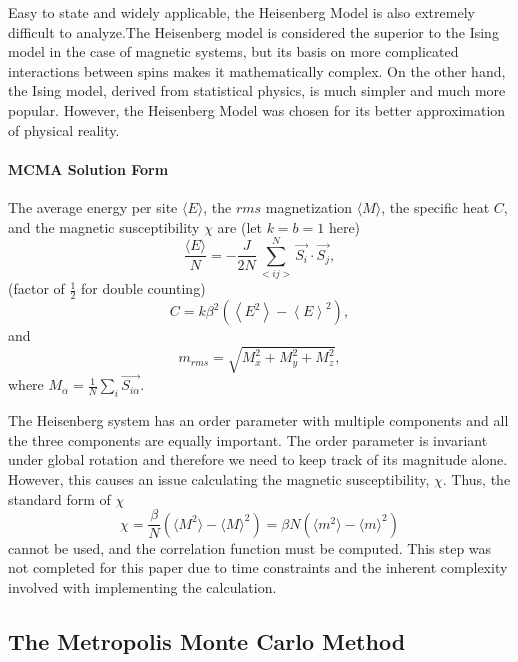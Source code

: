\documentclass[a4paper,12pt]{article}
\begin{document}
Easy to state and widely applicable, the Heisenberg Model is also extremely difficult to analyze.The Heisenberg model is considered the superior to the Ising model in the case of magnetic systems, but its basis on more complicated interactions between spins makes it mathematically complex. On the other hand, the Ising model, derived from statistical physics, is much simpler and much more popular. However, the Heisenberg Model was chosen for its better approximation of physical reality.
		\paragraph{MCMA Solution Form}
The average energy per site $\langle E \rangle$, the $rms$ magnetization  $\langle M \rangle$, the specific heat $C$, and the magnetic susceptibility $\chi$ are (let $k = b = 1$ here)
	\begin{equation}
		\frac{\langle E \rangle}{N} = -\frac{J}{2N}\sum_{<ij>}^{N}\vec{S_i}\cdot\vec{S_j},
	\end{equation}
	(factor of $\frac{1}{2}$ for double counting)
	\begin{equation}
		C = k\beta^2(\left< E^2 \right> - \left< E \right>^2),
	\end{equation}
	and
	\begin{equation}
		m_{rms} = \sqrt{M_x^2 + M_y^2 + M_z^2},
	\end{equation}
	where $\displaystyle M_\alpha = \frac{1}{N}\sum_i{\vec{S_{i\alpha}}}$.

The Heisenberg system has an order parameter with multiple components and all the three components are equally important. The order parameter is invariant under global rotation and therefore we need to keep track of its magnitude alone. However, this causes an issue calculating the magnetic susceptibility, $\chi$. Thus, the standard form of $\chi$
			\begin{equation}
				\chi = \frac{\beta}{N}(\langle M^2 \rangle - \langle M \rangle^2) = \beta N(\langle m^2 \rangle - \langle m \rangle^2)
			\end{equation}	
cannot be used, and the correlation function must be computed. This step was not completed for this paper due to time constraints and the inherent complexity involved with implementing the calculation.		     	  	

\subsection{The Metropolis Monte Carlo Method}
\end{document}
